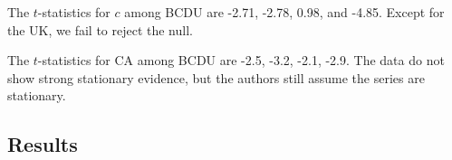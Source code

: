 \documentclass[12pt]{article}
\begin{document}
The $ t $-statistics for $ c $ among BCDU are -2.71, -2.78, 0.98, and -4.85. Except for
the UK, we fail to reject the null.

The $ t $-statistics for CA among BCDU are -2.5, -3.2, -2.1, -2.9.
The data do not show strong stationary evidence, but the authors still assume the
series are stationary.






\newpage
\subsection{Results}


\begin{figure}[H]
\end{figure}
\end{document}
